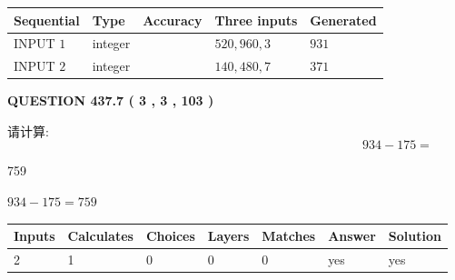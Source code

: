 \documentclass{ctexart}
\begin{document}
   
  
  
\noindent\begin{tabular}{|l|l|l|l|l|}
\hline
 Sequential & Type & Accuracy & Three inputs & Generated \\ 
\hline
 
 
  INPUT $  1 $ & integer &  & $
 520
 , 
 960
 , 
 3
 $ & $ 931 $ 
 \\  \hline  
 
 
  INPUT $  2 $ & integer &  & $
 140
 , 
 480
 , 
 7
 $ & $ 371 $ 
 \\  \hline  
 \end{tabular}
   
   
  
\vspace{0.2in}
  
{\textbf{\Large{QUESTION
437.7 
 ( 3 , 3 , 103 )
}}}
  
  
 
请计算:
\begin{equation}
934 -   %
175 = \nonumber
\end{equation}
 
 
 
\noindent{}
 
 

759
 
 
\noindent{}
 
 

 
 
 
\noindent{}
 
 

$ %
934 -  %
175=   %
759$
 
 
\noindent{}
 
 

 
   
   
   
   
\noindent\begin{tabular}{|l|l|l|l|l|l|l|}
 \hline
Inputs & Calculates & Choices & Layers & Matches & Answer & Solution \\ \hline
 2  & 
 1  & 
 0
  & 
 0  & 
 0  & 
  yes & 
  yes 
  \\ \hline
 \end{tabular}
   
\end{document}
